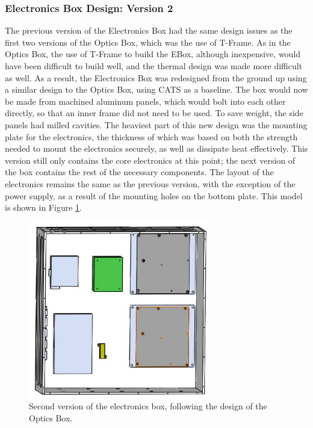 \subsubsection{Electronics Box Design: Version 2}
The previous version of the Electronics Box had the same design issues as the first two versions of the Optics Box, which was the use of T-Frame. As in the Optics Box, the use of T-Frame to build the EBox, although inexpensive, would have been difficult to build well, and the thermal design was made more difficult as well. As a result, the Electronics Box was redesigned from the ground up using a similar design to the Optics Box, using CATS as a baseline. The box would now be made from machined aluminum panels, which would bolt into each other directly, so that an inner frame did not need to be used. To save weight, the side panels had milled cavities. The heaviest part of this new design was the mounting plate for the electronics, the thickness of which was based on both the strength needed to mount the electronics securely, as well as dissipate heat effectively. This version still only contains the core electronics at this point; the next version of the box contains the rest of the necessary components. The layout of the electronics remains the same as the previous version, with the exception of the power supply, as a result of the mounting holes on the bottom plate. This model is shown in Figure \ref{fig:EBOX_V2}.

\begin{figure}
    \centering
    \includegraphics[width=0.7\textwidth]{chap3_images/LIFE_V4_images/Ebox_V2.JPG}
    \caption{Second version of the electronics box, following the design of the Optics Box.}
    \label{fig:EBOX_V2}
\end{figure}

